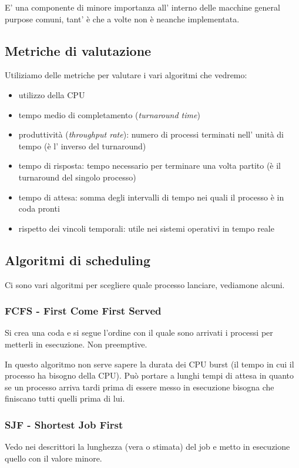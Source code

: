 E' una componente di minore importanza all' interno delle macchine general purpose comuni, tant' è che a volte non è neanche implementata.

\subsection{Metriche di valutazione}
Utiliziamo delle metriche per valutare i vari algoritmi che vedremo:
\begin{itemize}
    \item utilizzo della CPU
    \item tempo medio di completamento (\emph{turnaround time})
    \item produttività (\emph{throughput rate}): numero di processi terminati nell' unità di tempo
    (è l' inverso del turnaround)
    \item tempo di risposta: tempo necessario per terminare una volta partito (è il turnaround del singolo processo)
    \item tempo di attesa: somma degli intervalli di tempo nei quali il processo è in coda pronti
    \item rispetto dei vincoli temporali: utile nei sistemi operativi in tempo reale
\end{itemize}

\subsection{Algoritmi di scheduling}
Ci sono vari algoritmi per scegliere quale processo lanciare, vediamone alcuni.

\subsubsection{FCFS - First Come First Served}
Si crea una coda e si segue l'ordine con il quale sono arrivati i processi per metterli in esecuzione. Non preemptive.

In questo algoritmo non serve sapere la durata dei CPU burst (il tempo in cui il processo ha bisogno della CPU).
Può portare a lunghi tempi di attesa in quanto se un processo arriva tardi prima di essere messo in esecuzione bisogna che finiscano tutti quelli prima di lui.

\subsubsection{SJF - Shortest Job First}
Vedo nei descrittori la lunghezza (vera o stimata) del job e metto in esecuzione quello con il valore minore.

